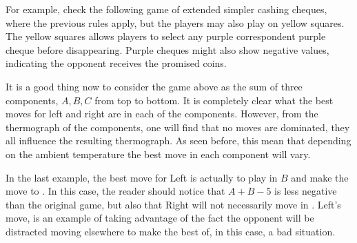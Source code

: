 For example, check the following game of extended simpler cashing cheques, where the previous rules apply, but the players may also play on yellow squares. The yellow squares allows players to select any purple correspondent purple cheque before disappearing. Purple cheques might also show negative values, indicating the opponent receives the promised coins.



It is a good thing now to consider the game above as the sum of three components, $A,B,C$ from top to bottom. It is completely clear what the best moves for left and right are in each of the components. However, from the thermograph of the components, one will find that no moves are dominated, they all influence the resulting thermograph. As seen before, this mean that depending on the ambient temperature the best move in each component will vary.

In the last example, the best move for Left is actually to play in $B$ and make the move to . In this case, the reader should notice that $A + B - 5$ is less negative than the original game, but also that Right will not necessarily move in . Left's move, is an example of taking advantage of the fact the opponent will be distracted moving elsewhere to make the best of, in this case, a bad situation.












